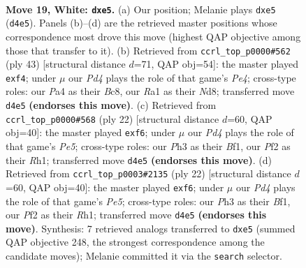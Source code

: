 \documentclass[11pt]{article}
\begin{document}
\clearpage

\begin{figure}[p]\centering
\begin{subfigure}{0.46\textwidth}\centering
\resizebox{\linewidth}{!}{%
\newchessgame
\chessboard[
  setfen={rnbqk2r/5p2/1p2p3/p3b1p1/P1BP4/2N4P/1P3PP1/R2Q1RK1 w q - 0 19},
  showmover=false,
  pgfstyle=straightmove, color=movearrow, markmove={d4-e5}
]}
\caption{}
\end{subfigure}\hfill
\begin{subfigure}{0.46\textwidth}\centering
\resizebox{\linewidth}{!}{%
\newchessgame
\chessboard[
  setfen={2bn1r1k/4rqpp/1p3n2/pP2p3/P4P2/2BP2P1/3N2BP/R2QR1K1 b - - 0 22},
  showmover=false,
  pgfstyle=straightmove, color=movearrow, markmove={e5-f4}
]}
\caption{}
\end{subfigure}
\\[4pt]
\begin{subfigure}{0.46\textwidth}\centering
\resizebox{\linewidth}{!}{%
\newchessgame
\chessboard[
  setfen={rnbqk2r/p4p2/2p1pb2/1p2P3/2pP4/2N5/PP3PPP/R2QKB1R w KQkq - 0 12},
  showmover=false,
  pgfstyle=straightmove, color=movearrow, markmove={e5-f6}
]}
\caption{}
\end{subfigure}\hfill
\begin{subfigure}{0.46\textwidth}\centering
\resizebox{\linewidth}{!}{%
\newchessgame
\chessboard[
  setfen={rnbqk2r/p4p2/2p1pb2/1p2P3/2pP4/2N5/PP3PPP/R2QKB1R w KQkq - 0 12},
  showmover=false,
  pgfstyle=straightmove, color=movearrow, markmove={e5-f6}
]}
\caption{}
\end{subfigure}
\caption{\textbf{Move 19, White: \texttt{dxe5}.} (a) Our position; Melanie plays \texttt{dxe5} (\texttt{d4e5}). Panels (b)--(d) are the retrieved master positions whose correspondence most drove this move (highest QAP objective among those that transfer to it). (b) Retrieved from \texttt{ccrl\_top\_p0000\#562} (ply 43) [structural distance $d$=71, QAP obj=54]: the master played \texttt{exf4}; under $\mu$ our \emph{Pd4} plays the role of that game's \emph{Pe4}; cross-type roles: our \emph{P}a4 as their \emph{B}c8, our \emph{R}a1 as their \emph{N}d8; transferred move \texttt{d4e5} \textbf{(endorses this move)}. (c) Retrieved from \texttt{ccrl\_top\_p0000\#568} (ply 22) [structural distance $d$=60, QAP obj=40]: the master played \texttt{exf6}; under $\mu$ our \emph{Pd4} plays the role of that game's \emph{Pe5}; cross-type roles: our \emph{P}h3 as their \emph{B}f1, our \emph{P}f2 as their \emph{R}h1; transferred move \texttt{d4e5} \textbf{(endorses this move)}. (d) Retrieved from \texttt{ccrl\_top\_p0003\#2135} (ply 22) [structural distance $d$=60, QAP obj=40]: the master played \texttt{exf6}; under $\mu$ our \emph{Pd4} plays the role of that game's \emph{Pe5}; cross-type roles: our \emph{P}h3 as their \emph{B}f1, our \emph{P}f2 as their \emph{R}h1; transferred move \texttt{d4e5} \textbf{(endorses this move)}. Synthesis: 7 retrieved analogs transferred to \texttt{dxe5} (summed QAP objective 248, the strongest correspondence among the candidate moves); Melanie committed it via the \texttt{search} selector.}
\label{fig:thought-m36}
\end{figure}
\end{document}
